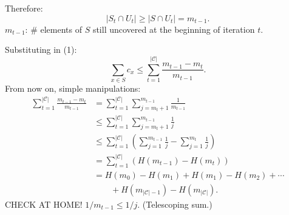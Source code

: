 Therefore:
\[|S_t\cap U_t|\geq|S\cap U_t|=m_{t-1}.\]
$m_{t-1}$: \# elements of $S$ still uncovered at the beginning of iteration $t$.

Substituting in (1):
\[\sum_{x\in S}c_x\leq\sum_{t=1}^{|\mathcal C|}\frac{m_{t-1}-m_t}{m_{t-1}}.\]
From now on, simple manipulations:
\begin{align*}
\sum_{t=1}^{|\mathcal C|}\frac{m_{t-1}-m_t}{m_{t-1}}
&=\sum_{t=1}^{|\mathcal C|}\sum_{j=m_t+1}^{m_{t-1}}\frac1{m_{t-1}}\\
&\leq\sum_{t=1}^{|\mathcal C|}\sum_{j=m_t+1}^{m_{t-1}}\frac1j\\
&\leq\sum_{t=1}^{|\mathcal C|}\left(\sum_{j=1}^{m_{t-1}}\frac1j-\sum_{j=1}^{m_t}\frac1j\right)\\
&=\sum_{t=1}^{|\mathcal C|}(H(m_{t-1})-H(m_t))\\
&=H(m_0)-H(m_1)+H(m_1)-H(m_2)+\cdots\\
&\hspace{2em}+H(m_{|\mathcal C|-1})-H(m_{|\mathcal C|}).
\end{align*}
CHECK AT HOME! $1/m_{t-1}\leq1/j$.
(Telescoping sum.)
